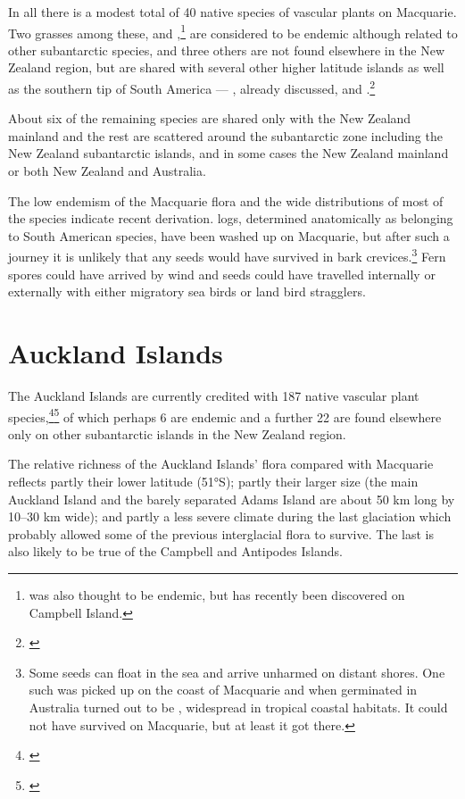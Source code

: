 In all there is a modest total of 40 native species of vascular plants on Macquarie.
Two grasses among these,  and ,\footnote{ was also thought to be endemic, but has recently been discovered on Campbell Island.} are considered to be endemic although related to other subantarctic species, and three others are not found elsewhere in the New Zealand region, but are shared with several other higher latitude islands as well as the southern tip of South America --- , already discussed,  and .\footnote{\cite{wace1960botany}}

About six of the remaining species are shared only with the New Zealand mainland and the rest are scattered around the subantarctic zone including the New Zealand subantarctic islands, and in some cases the New Zealand mainland or both New Zealand and Australia.

The low endemism of the Macquarie flora and the wide distributions of most of the species indicate recent derivation.  logs, determined anatomically as belonging to South American species, have been washed up on Macquarie, but after such a journey it is unlikely that any seeds would have survived in bark crevices.\footnote{Some seeds can float in the sea and arrive unharmed on distant shores. One such was picked up on the coast of Macquarie and when germinated in Australia turned out to be , widespread in tropical coastal habitats. It could not have survived on Macquarie, but at least it got there.}
Fern spores could have arrived by wind and seeds could have travelled internally or externally with either migratory sea birds or land bird stragglers.

\section{Auckland Islands}

The Auckland Islands are currently credited with 187 native vascular plant species,\footnote{\cite{meurk1982supplementary}}\footnote{\cite{johnson1975vascular}} of which perhaps 6 are endemic and a further 22 are found elsewhere only on other subantarctic islands in the New Zealand region.

The relative richness of the Auckland Islands' flora compared with Macquarie reflects partly their lower latitude (51°S); partly their larger size (the main Auckland Island and the barely separated Adams Island are about 50 km long by 10--30 km wide); and partly a less severe climate during the last glaciation which probably allowed some of the previous interglacial flora to survive.
The last is also likely to be true of the Campbell and Antipodes Islands.

